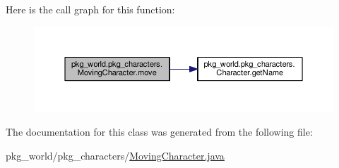 Here is the call graph for this function\-:\nopagebreak
\begin{figure}[H]
\begin{center}
\leavevmode
\includegraphics[width=350pt]{classpkg__world_1_1pkg__characters_1_1MovingCharacter_aaf4df04191a12b44ecf4d5e127c3a969_cgraph}
\end{center}
\end{figure}




The documentation for this class was generated from the following file\-:\begin{DoxyCompactItemize}
\item 
pkg\-\_\-world/pkg\-\_\-characters/\hyperlink{MovingCharacter_8java}{Moving\-Character.\-java}\end{DoxyCompactItemize}
